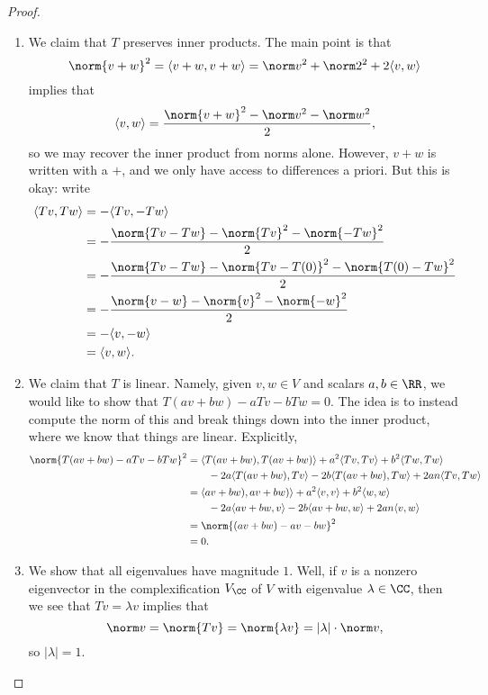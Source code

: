 \documentclass{article}
\begin{document}
\begin{proof}
\begin{enumerate}

        \item We claim that $T$ preserves inner products. The main point is that
        \[\norm{v+w}^2=\langle v+w,v+w\rangle=\norm v^2+\norm 2^2+2\langle v,w\rangle\]
        implies that
        \[\langle v,w\rangle=\frac{\norm{v+w}^2-\norm v^2-\norm w^2}2,\]
        so we may recover the inner product from norms alone. However, $v+w$ is written with a $+$, and we only have access to differences a priori. But this is okay: write
        \begin{align*}
            \langle Tv,Tw\rangle &= -\langle Tv,-Tw\rangle \\
            &= -\frac{\norm{Tv-Tw}-\norm{Tv}^2-\norm{-Tw}^2}2 \\
            &= -\frac{\norm{Tv-Tw}-\norm{Tv-T(0)}^2-\norm{T(0)-Tw}^2}2 \\
            &= -\frac{\norm{v-w}-\norm{v}^2-\norm{-w}^2}2 \\
            &= -\langle v,-w\rangle \\
            &= \langle v,w\rangle.
        \end{align*}

        \item We claim that $T$ is linear. Namely, given $v,w\in V$ and scalars $a,b\in\RR$, we would like to show that $T(av+bw)-aTv-bTw=0$. The idea is to instead compute the norm of this and break things down into the inner product, where we know that things are linear. Explicitly,
        \begin{align*}
            \norm{T(av+bw)-aTv-bTw}^2 &= \langle T(av+bw),T(av+bw)\rangle+a^2\langle Tv,Tv\rangle+b^2\langle Tw,Tw\rangle \\
            &\qquad-2a\langle T(av+bw),Tv\rangle-2b\langle T(av+bw),Tw\rangle+2an\langle Tv,Tw\rangle \\
            &= \langle av+bw),av+bw)\rangle+a^2\langle v,v\rangle+b^2\langle w,w\rangle \\
            &\qquad-2a\langle av+bw,v\rangle-2b\langle av+bw,w\rangle+2an\langle v,w\rangle \\
            &= \norm{(av+bw)-av-bw}^2 \\
            &= 0.
        \end{align*}

        \item We show that all eigenvalues have magnitude $1$. Well, if $v$ is a nonzero eigenvector in the complexification $V_\CC$ of $V$ with eigenvalue $\lambda\in\CC$, then we see that $Tv=\lambda v$ implies that
        \[\norm v=\norm{Tv}=\norm{\lambda v}=\left|\lambda\right|\cdot\norm v,\]
        so $\left|\lambda\right|=1$.


\end{enumerate}
\end{proof}
\end{document}
